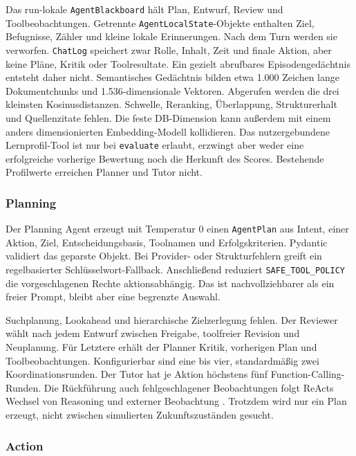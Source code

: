 Das run-lokale \texttt{AgentBlackboard} hält Plan, Entwurf, Review und
Toolbeobachtungen. Getrennte \texttt{AgentLocalState}-Objekte enthalten Ziel,
Befugnisse, Zähler und kleine lokale Erinnerungen. Nach dem Turn werden sie
verworfen. \texttt{ChatLog} speichert zwar Rolle, Inhalt, Zeit und finale
Aktion, aber keine Pläne, Kritik oder Toolresultate. Ein gezielt abrufbares
Episodengedächtnis entsteht daher nicht. Semantisches Gedächtnis bilden etwa
1.000 Zeichen lange Dokumentchunks und 1.536-dimensionale Vektoren. Abgerufen
werden die drei kleinsten Kosinusdistanzen. Schwelle, Reranking, Überlappung,
Strukturerhalt und Quellenzitate fehlen. Die feste DB-Dimension kann außerdem
mit einem anders dimensionierten Embedding-Modell kollidieren. Das
nutzergebundene Lernprofil-Tool ist nur bei \texttt{evaluate} erlaubt, erzwingt
aber weder eine erfolgreiche vorherige Bewertung noch die Herkunft des Scores.
Bestehende Profilwerte erreichen Planner und Tutor nicht.

\subsubsection{Planning}

Der Planning Agent erzeugt mit Temperatur 0 einen \texttt{AgentPlan} aus Intent,
einer Aktion, Ziel, Entscheidungsbasis, Toolnamen und Erfolgskriterien. Pydantic
validiert das geparste Objekt. Bei Provider- oder Strukturfehlern greift ein
regelbasierter Schlüsselwort-Fallback. Anschließend reduziert
\texttt{SAFE\_TOOL\_POLICY} die vorgeschlagenen Rechte aktionsabhängig. Das ist
nachvollziehbarer als ein freier Prompt, bleibt aber eine begrenzte Auswahl.

Suchplanung, Lookahead und hierarchische Zielzerlegung fehlen. Der Reviewer
wählt nach jedem Entwurf zwischen Freigabe, toolfreier Revision und Neuplanung.
Für Letztere erhält der Planner Kritik, vorherigen Plan und Toolbeobachtungen.
Konfigurierbar sind eine bis vier, standardmäßig zwei Koordinationsrunden. Der
Tutor hat je Aktion höchstens fünf Function-Calling-Runden. Die Rückführung auch
fehlgeschlagener Beobachtungen folgt ReActs Wechsel von Reasoning und externer
Beobachtung \parencite{yaoEtAl2023react}. Trotzdem wird nur ein Plan erzeugt,
nicht zwischen simulierten Zukunftszuständen gesucht.

\subsubsection{Action}


